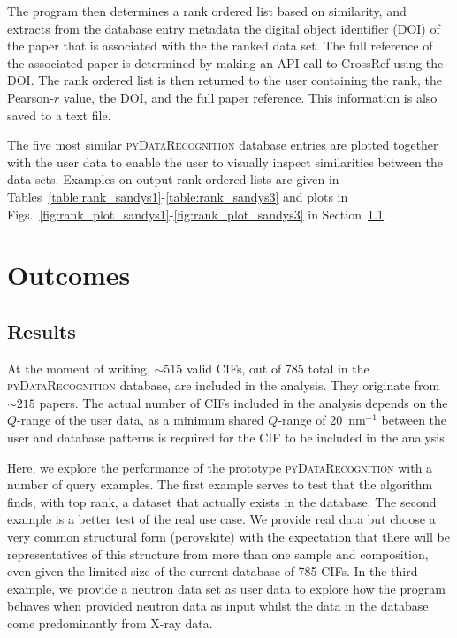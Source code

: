 \documentclass[preprint]{iucr}
\newcommand{\done}{\textcolor{dgreen}{{\large{$\checkmark$}}}}
\newcommand{\figs}[1]{Figs.~\ref{fig:#1}}
\newcommand{\pydr}{\textsc{pyDataRecognition}\xspace}
\begin{document}
The program then determines a rank ordered list based on similarity, and extracts from the database entry metadata the digital object identifier (DOI) \cite{paskinUniqueIdentifiers1999} of the paper that is associated with the the ranked data set.  The full reference of the associated paper is determined by making an API call to CrossRef \cite{crossrefRESTAPI2020} using the DOI.   The rank ordered list is then returned  to the user containing the rank, the Pearson-$r$ value, the DOI, and the full paper reference.  This information is also saved to a text file.

The five most similar \pydr database entries are plotted together with the user data to enable the user to visually inspect similarities between the data sets. 
Examples on output rank-ordered lists are given in Tables~\ref{table:rank_sandys1}-\ref{table:rank_sandys3} and plots in \figs{rank_plot_sandys1}-\ref{fig:rank_plot_sandys3} in Section~\ref{sec:results}.

\section{Outcomes}
\label{sec:outcomes}
\subsection{Results}
\label{sec:results}

At the moment of writing, $\sim515$ valid CIFs, out of 785 total in the \pydr database, are included in the analysis. They originate from $\sim215$ papers. The actual number of CIFs included in the analysis depends on the $Q$-range of the user data, as a minimum shared $Q$-range of 20~nm$^{-1}$ between the user and database patterns is required for the CIF to be included in the analysis.

Here, we explore the performance of the prototype \pydr with a number of query examples. The first example serves to test that the algorithm finds, with top rank, a dataset that actually exists in the database. The second example is a better test of the real use case. We provide real data but choose a very common structural form (perovskite) with the expectation that there will be representatives of this structure from more than one sample and composition, even given the  limited size of the current database of 785 CIFs. In the third example, we provide a neutron data set as user data to explore how the program behaves when provided neutron data as input whilst the data in the database come predominantly from X-ray data.
\end{document}
